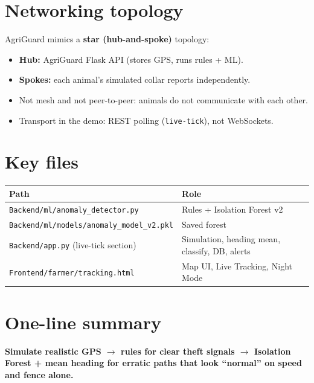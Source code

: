 \documentclass[11pt,a4paper]{article}
\begin{document}
\section{Networking topology}

AgriGuard mimics a \textbf{star (hub-and-spoke)} topology:

\begin{itemize}[leftmargin=*]
  \item \textbf{Hub:} AgriGuard Flask API (stores GPS, runs rules + ML).
  \item \textbf{Spokes:} each animal's simulated collar reports independently.
  \item Not mesh and not peer-to-peer: animals do not communicate with each other.
  \item Transport in the demo: REST polling (\texttt{live-tick}), not WebSockets.
\end{itemize}

\section{Key files}

\begin{center}
\begin{tabular}{@{}lp{8.5cm}@{}}
\toprule
\textbf{Path} & \textbf{Role} \\
\midrule
\texttt{Backend/ml/anomaly\_detector.py}
  & Rules + Isolation Forest v2 \\
\texttt{Backend/ml/models/anomaly\_model\_v2.pkl}
  & Saved forest \\
\texttt{Backend/app.py} (live-tick section)
  & Simulation, heading mean, classify, DB, alerts \\
\texttt{Frontend/farmer/tracking.html}
  & Map UI, Live Tracking, Night Mode \\
\bottomrule
\end{tabular}
\end{center}

\section{One-line summary}

\textbf{Simulate realistic GPS $\rightarrow$ rules for clear theft signals $\rightarrow$
Isolation Forest + mean heading for erratic paths that look ``normal'' on speed and fence alone.}
\end{document}
